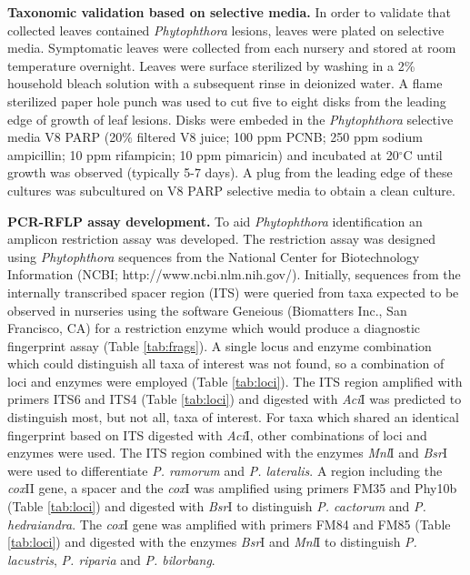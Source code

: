 \documentclass[12pt]{article}
\begin{document}
\textbf{Taxonomic validation based on selective media.} In order to validate that collected leaves contained \emph{Phytophthora} lesions, leaves were plated on selective media.  Symptomatic leaves were collected from each nursery and stored at room temperature overnight.  Leaves were surface sterilized by washing in a 2\% household bleach solution with a subsequent rinse in deionized water.  A flame sterilized paper hole punch was used to cut five to eight disks from the leading edge of growth of leaf lesions.  Disks were embeded in the \emph{Phytophthora} selective media V8 PARP (20\% filtered V8 juice; 100 ppm PCNB; 250 ppm sodium ampicillin; 10 ppm rifampicin; 10 ppm pimaricin)\cite{jeffers_martin_1986} and incubated at 20$^\circ$C until growth was observed (typically 5-7 days).  A plug from the leading edge of these cultures was subcultured on V8 PARP selective media to obtain a clean culture.

\textbf{PCR-RFLP assay development.}  To aid \emph{Phytophthora} identification an amplicon restriction assay was developed.  The restriction assay was designed using \emph{Phytophthora} sequences from the National Center for Biotechnology Information (NCBI; http://www.ncbi.nlm.nih.gov/).  Initially, sequences from the internally transcribed spacer region (ITS) were queried from taxa expected to be observed in nurseries using the software Geneious (Biomatters Inc., San Francisco, CA) for a restriction enzyme which would produce a diagnostic fingerprint assay (Table \ref{tab:frags}).  A single locus and enzyme combination which could distinguish all taxa of interest was not found, so a combination of loci and enzymes were employed (Table \ref{tab:loci}).  The ITS region amplified with primers ITS6 and ITS4 (Table \ref{tab:loci}) and digested with \emph{Aci}I was predicted to distinguish most, but not all, taxa of interest.  For taxa which shared an identical fingerprint based on ITS digested with \emph{Aci}I, other combinations of loci and enzymes were used.  The ITS region combined with the enzymes \emph{Mnl}I and \emph{Bsr}I were used to differentiate \emph{P. ramorum} and \emph{P. lateralis}.  A region including the \emph{cox}II gene, a spacer and the \emph{cox}I was amplified using primers FM35 and Phy10b (Table \ref{tab:loci}) and digested with \emph{Bsr}I to distinguish \emph{P. cactorum} and \emph{P. hedraiandra}.  The \emph{cox}I gene was amplified with primers FM84 and FM85 (Table \ref{tab:loci}) and digested with the enzymes \emph{Bsr}I and \emph{Mnl}I to distinguish \emph{P. lacustris}, \emph{P. riparia} and \emph{P. bilorbang}.
\end{document}
